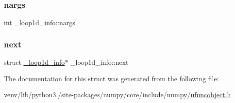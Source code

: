 \mbox{\label{struct__loop1d__info_a733e2a40b1b5938e2f43d34bbfaf1d55}} 
\subsubsection{\texorpdfstring{nargs}{nargs}}
{\footnotesize\ttfamily int \+\_\+loop1d\+\_\+info\+::nargs}

\mbox{\label{struct__loop1d__info_ab0866f982039f11fdca4293570de656a}} 
\subsubsection{\texorpdfstring{next}{next}}
{\footnotesize\ttfamily struct \hyperlink{struct__loop1d__info}{\+\_\+loop1d\+\_\+info}$\ast$ \+\_\+loop1d\+\_\+info\+::next}



The documentation for this struct was generated from the following file\+:\begin{DoxyCompactItemize}
\item 
venv/lib/python3./site-\/packages/numpy/core/include/numpy/\hyperlink{ufuncobject_8h}{ufuncobject.\+h}\end{DoxyCompactItemize}
